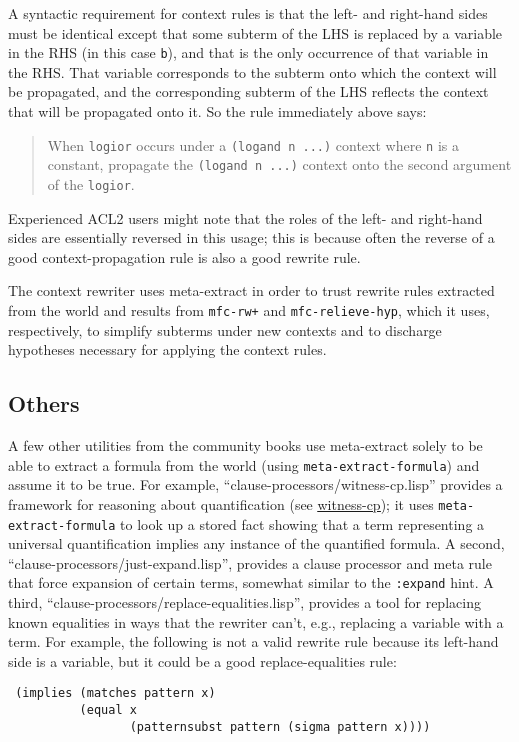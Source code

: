 \noindent A syntactic requirement for context rules is that the left-
and right-hand sides must be identical except that some subterm of the
LHS is replaced by a variable in the RHS (in this case \texttt{b}),
and that is the only occurrence of that variable in the RHS.  That
variable corresponds to the subterm onto which the context will be
propagated, and the corresponding subterm of the LHS reflects the
context that will be propagated onto it.  So the rule immediately above says:
\begin{quote}
When \texttt{logior} occurs under a \texttt{(logand n ...)} context where
\texttt{n} is a constant, propagate the \texttt{(logand n ...)} context
onto the second argument of the \texttt{logior}.
\end{quote}
\noindent Experienced ACL2 users might note that the roles of the
left- and right-hand sides are essentially reversed in this usage;
this is because often the reverse of a good context-propagation rule
is also a good rewrite rule.

The context rewriter uses meta-extract in order to trust rewrite rules
extracted from the world and results from \texttt{mfc-rw+} and
\texttt{mfc-relieve-hyp}, which it uses, respectively, to simplify
subterms under new contexts and to discharge hypotheses necessary for
applying the context rules.

\subsection{Others}

A few other utilities from the community books use
meta-extract solely to be able to extract a formula from the world
(using \texttt{meta-extract-formula}) and assume it to be true.  For
example, ``clause-processors/witness-cp.lisp'' provides a framework
for reasoning about quantification (see
\href{http://www.cs.utexas.edu/users/moore/acl2/manuals/current/manual/index.html?topic=ACL2\_\_\_\_WITNESS-CP}{\underline{witness-cp}});
it uses \texttt{meta-extract-formula} to look up a stored fact showing
that a term representing a universal quantification implies any
instance of the quantified formula.  A second,
``clause-processors/just-expand.lisp'', provides a clause processor
and meta rule that force expansion of certain terms, somewhat similar
to the \texttt{:expand} hint.  A third,
``clause-processors/replace-equalities.lisp'', provides a tool for
replacing known equalities in ways that the
rewriter can't, e.g., replacing a variable with a term.  For example, the
following is not a valid rewrite rule because its left-hand side is a
variable, but it could be a good replace-equalities rule:
\begin{verbatim}
 (implies (matches pattern x)
          (equal x
                 (patternsubst pattern (sigma pattern x))))
\end{verbatim}

